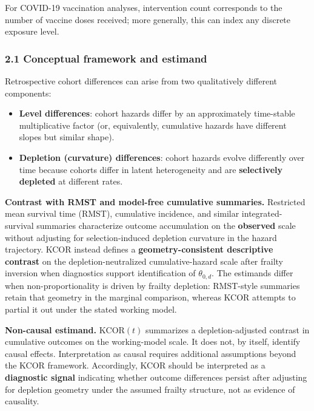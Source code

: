 \documentclass[
]{article}
\providecommand{\tightlist}{%
  \setlength{\itemsep}{0pt}\setlength{\parskip}{0pt}}
\begin{document}
For COVID-19 vaccination analyses, intervention count corresponds to the
number of vaccine doses received; more generally, this can index any
discrete exposure level.

\subsubsection{2.1 Conceptual framework and
estimand}\label{conceptual-framework-and-estimand}

Retrospective cohort differences can arise from two qualitatively
different components:

\begin{itemize}
\tightlist
\item
  \textbf{Level differences}: cohort hazards differ by an approximately
  time-stable multiplicative factor (or, equivalently, cumulative
  hazards have different slopes but similar shape).
\item
  \textbf{Depletion (curvature) differences}: cohort hazards evolve
  differently over time because cohorts differ in latent heterogeneity
  and are \textbf{selectively depleted} at different rates.
\end{itemize}

\textbf{Contrast with RMST and model-free cumulative summaries.}
Restricted mean survival time (RMST), cumulative incidence, and similar
integrated-survival summaries characterize outcome accumulation on the
\textbf{observed} scale without adjusting for selection-induced
depletion curvature in the hazard trajectory. KCOR instead defines a
\textbf{geometry-consistent descriptive contrast} on the
depletion-neutralized cumulative-hazard scale after frailty inversion
when diagnostics support identification of \(\theta_{0,d}\). The
estimands differ when non-proportionality is driven by frailty
depletion: RMST-style summaries retain that geometry in the marginal
comparison, whereas KCOR attempts to partial it out under the stated
working model.

\textbf{Non-causal estimand.} \(\mathrm{KCOR}(t)\) summarizes a
depletion-adjusted contrast in cumulative outcomes on the working-model
scale. It does not, by itself, identify causal effects. Interpretation
as causal requires additional assumptions beyond the KCOR framework.
Accordingly, KCOR should be interpreted as a \textbf{diagnostic signal}
indicating whether outcome differences persist after adjusting for
depletion geometry under the assumed frailty structure, not as evidence
of causality.
\end{document}
